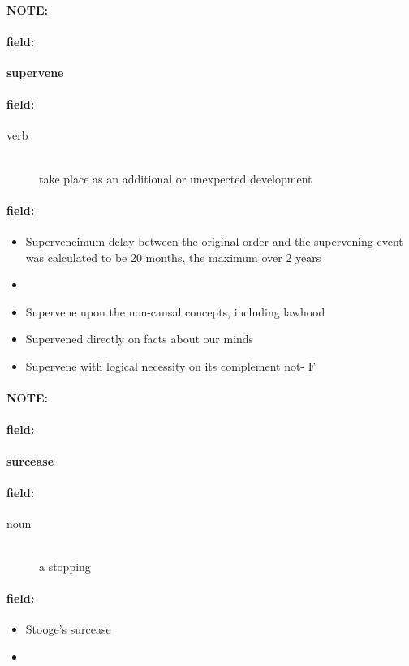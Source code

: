 \documentclass[12pt]{article}
\newenvironment{note}{\paragraph{NOTE:}}{}
\newenvironment{field}{\paragraph{field:}}{}
\begin{document}
\begin{note}
\begin{field}
\textbf{\large supervene}
\end{field}


\begin{field}
\begin{description}
\item[verb] \hfill \\ 
take place as an additional or unexpected development

\end{description}
\end{field}

\begin{field}
\begin{itemize}
\item Superveneimum delay between the original order and the supervening event was calculated to be 20 months, the maximum over 2 years
\item 
\item Supervene upon the non-causal concepts, including lawhood
\item Supervened directly on facts about our minds
\item Supervene with logical necessity on its complement not- F
\end{itemize}
\end{field}
\end{note}
\begin{note}
\begin{field}
\textbf{\large surcease}
\end{field}


\begin{field}
\begin{description}
\item[noun] \hfill \\ 
a stopping

\end{description}
\end{field}

\begin{field}
\begin{itemize}
\item Stooge's surcease
\item 
\end{itemize}
\end{field}
\end{note}
\end{document}
